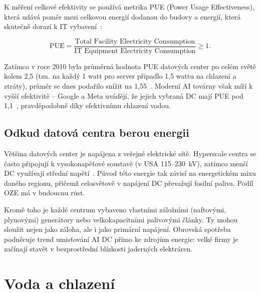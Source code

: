 K měření celkové efektivity se používá metrika PUE (Power Usage Effectiveness), která udává poměr mezi celkovou energií dodanou do budovy a energií, která skutečně dorazí k IT vybavení~\cite{chen_electricity_2025}:

$$\text{PUE} = \frac{\text{Total Facility Electricity Consumption}}{\text{IT Equipment Electricity Consumption}} \geq 1.$$

Zatímco v roce 2010 byla průměrná hodnota PUE datových center po celém světě kolem 2,5 (tzn. na každý 1 watt pro server připadlo 1,5 wattu na chlazení a ztráty), průměr se dnes podařilo snížit na 1,55~\cite{de_roucy-rochegonde_ai_2025}. Moderní AI továrny však míří k vyšší efektivitě -- Google a Meta uvádějí, že jejich vybraná DC mají PUE pod 1,1~\cite{chen_electricity_2025, sheng_power_2026}, pravděpodobně díky efektivnímu chlazení vodou.

\subsection{Odkud datová centra berou energii}
\label{subsec:odkud_energie}

Většina datových center je napájena z veřejné elektrické sítě. Hyperscale centra se často připojují k vysokonapěťové soustavě (v USA 115--230~kV), zatímco menší DC využívají střední napětí~\cite[s.~4]{chen_electricity_2025}. Původ této energie tak závisí na energetickém mixu daného regionu, přičemž celosvětově v napájení DC převažují fosilní paliva. Podíl OZE má v budoucnu růst.~\cite[s.~86]{international_energy_agency_iea_energy_2025}

Kromě toho je každé centrum vybaveno vlastními záložními (naftovými, plynovými) generátory nebo velkokapacitními palivovými články. Ty mohou sloužit nejen jako záloha, ale i jako primární napájení. Obrovská spotřeba podněcuje trend umisťování AI DC přímo ke zdrojům energie: velké firmy je začínají stavět v bezprostřední blízkosti jaderných elektráren.~\cite{chen_electricity_2025, cruzes_data_2025, international_energy_agency_iea_energy_2025} 

\section{Voda a chlazení}
\label{sec:chlazeni}



